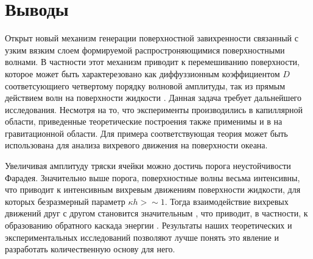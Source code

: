 \section{Выводы}
Открыт новый механизм генерации поверхностной завихренности связанный с узким вязким слоем формируемой распростроняющимися поверхностными волнами. В частности этот механизм приводит к перемешиванию поверхности, которое может быть характерезовано как диффуззионным коэффициентом $D$ соответсующиего четвертому порядку волновой амплитуды, так из прямым действием волн на поверхности жидкости \cite{Falkovich, Buhler}. Данная задача требует дальнейшего исследования. Несмотря на то, что эксперименты производились в капиллярной области, приведенные теоретические построения также применимы и в на гравитационной области. Для примера соответствующая теория может быть использована для анализа вихревого движения на поверхности океана.

Увеличивая амплитуду тряски ячейки можно достичь порога неустойчивости Фарадея. Значительно выше порога, поверхностные волны весьма интенсивны, что приводит к интенсивным вихревым движениям поверхности жидкости, для которых безразмерный параметр $\kappa h > \sim 1$. Тогда взаимодействие вихревых движений друг с другом становится значительным \cite{Punzmann}, что приводит, в частности, к образованию обратного каскада энергии \cite{Francois2013}. Результаты наших теоретических и экспериментальных исследований позволяют лучше понять это явление и разработать количественную основу для него.

\clearpage